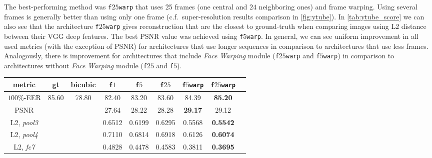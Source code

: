 The best-performing method was \texttt{f$25$warp} that uses 25 frames (one central and $24$ neighboring ones) and frame warping. Using several frames is generally better than using only one frame (c.f.~super-resolution results comparison in \ref{fig:ytube}). In \ref{tab:ytube_score} we can also see that the architecture \texttt{f$25$warp} gives reconstruction that are the closest to ground-truth when comparing images using L2 distance between their VGG deep features. The best PSNR value was achieved using \texttt{f$5$warp}. In general, we can see uniform improvement in all used metrics (with the exception of PSNR) for architectures that use longer sequences in comparison to architectures that use less frames. Analogously, there is improvement for architectures that include \emph{Face Warping} module (\texttt{f$25$warp} and \texttt{f$5$warp}) in comparison to architectures without \emph{Face Warping} module (\texttt{f$25$} and \texttt{f$5$}).



\begin{table*}
\centering
\begin{tabular}{c | c c c c c c c c}
 metric & gt & bicubic & \texttt{f$1$} & \texttt{f$5$} &  \texttt{f$25$} & \texttt{f$5$warp} &  \texttt{f$25$warp}  \\
\hline
$100$\%-EER & 85.60 & 78.80 & 82.40 & 83.20 & 83.60 & 84.39 & \bf{85.20}\\
PSNR      && & 27.64 & 28.22 & 28.28 &  \bf{29.17} & 29.12 \\
L2, \emph{pool3} &&& 0.6512 & 0.6199 & 0.6295 & 0.5568 &  \bf{0.5542} \\
L2, \emph{pool4} &&& 0.7110 & 0.6814 & 0.6918 & 0.6126 &  \bf{0.6074} \\
L2, \emph{fc7} &&& 0.4828 & 0.4478 & 0.4583 & 0.3811 &  \bf{0.3695} \\




\end{tabular}
\caption{Different metrics for several architectures evaluated in this work (see section \ref{sec:arch}). First row (face verification metric): 100\%-EER(Equal error rate), second row: PSNR - peak signal to noise ratio. Rows $3$-$5$ show mean Euclidean distances between deep features of ground truth and reconstructed images extracted using VGG-face layers \emph{pool3}, \emph{pool4}, \emph{fc7} (after normalization). Such metrics are strongly correlated with recognition. The best performing architecture is \texttt{f$25$warp} that accepts sequences of length $25$ and includes \emph{Face Warping} sub-network. See section \ref{sec:video} for details.}
\label{tab:ytube_score}
\end{table*}

